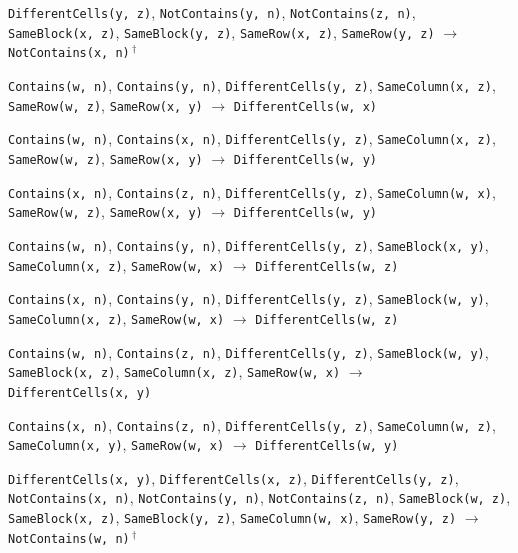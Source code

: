 \documentclass[11pt,a4paper]{article}
\theoremstyle{definition}
\theoremstyle{remark}
\begin{document}
{\begin{enumerate}[label={[\arabic*]},leftmargin=2.6em,itemsep=1pt]
  \item \texttt{DifferentCells(y,~z)}, \allowbreak \texttt{NotContains(y,~n)}, \allowbreak \texttt{NotContains(z,~n)}, \allowbreak \texttt{SameBlock(x,~z)}, \allowbreak \texttt{SameBlock(y,~z)}, \allowbreak \texttt{SameRow(x,~z)}, \allowbreak \texttt{SameRow(y,~z)} \;$\to$\; \texttt{NotContains(x,~n)}\,$^{\dagger}$
  \item \texttt{Contains(w,~n)}, \allowbreak \texttt{Contains(y,~n)}, \allowbreak \texttt{DifferentCells(y,~z)}, \allowbreak \texttt{SameColumn(x,~z)}, \allowbreak \texttt{SameRow(w,~z)}, \allowbreak \texttt{SameRow(x,~y)} \;$\to$\; \texttt{DifferentCells(w,~x)}
  \item \texttt{Contains(w,~n)}, \allowbreak \texttt{Contains(x,~n)}, \allowbreak \texttt{DifferentCells(y,~z)}, \allowbreak \texttt{SameColumn(x,~z)}, \allowbreak \texttt{SameRow(w,~z)}, \allowbreak \texttt{SameRow(x,~y)} \;$\to$\; \texttt{DifferentCells(w,~y)}
  \item \texttt{Contains(x,~n)}, \allowbreak \texttt{Contains(z,~n)}, \allowbreak \texttt{DifferentCells(y,~z)}, \allowbreak \texttt{SameColumn(w,~x)}, \allowbreak \texttt{SameRow(w,~z)}, \allowbreak \texttt{SameRow(x,~y)} \;$\to$\; \texttt{DifferentCells(w,~y)}
  \item \texttt{Contains(w,~n)}, \allowbreak \texttt{Contains(y,~n)}, \allowbreak \texttt{DifferentCells(y,~z)}, \allowbreak \texttt{SameBlock(x,~y)}, \allowbreak \texttt{SameColumn(x,~z)}, \allowbreak \texttt{SameRow(w,~x)} \;$\to$\; \texttt{DifferentCells(w,~z)}
  \item \texttt{Contains(x,~n)}, \allowbreak \texttt{Contains(y,~n)}, \allowbreak \texttt{DifferentCells(y,~z)}, \allowbreak \texttt{SameBlock(w,~y)}, \allowbreak \texttt{SameColumn(x,~z)}, \allowbreak \texttt{SameRow(w,~x)} \;$\to$\; \texttt{DifferentCells(w,~z)}
  \item \texttt{Contains(w,~n)}, \allowbreak \texttt{Contains(z,~n)}, \allowbreak \texttt{DifferentCells(y,~z)}, \allowbreak \texttt{SameBlock(w,~y)}, \allowbreak \texttt{SameBlock(x,~z)}, \allowbreak \texttt{SameColumn(x,~z)}, \allowbreak \texttt{SameRow(w,~x)} \;$\to$\; \texttt{DifferentCells(x,~y)}
  \item \texttt{Contains(x,~n)}, \allowbreak \texttt{Contains(z,~n)}, \allowbreak \texttt{DifferentCells(y,~z)}, \allowbreak \texttt{SameColumn(w,~z)}, \allowbreak \texttt{SameColumn(x,~y)}, \allowbreak \texttt{SameRow(w,~x)} \;$\to$\; \texttt{DifferentCells(w,~y)}
  \item \texttt{DifferentCells(x,~y)}, \allowbreak \texttt{DifferentCells(x,~z)}, \allowbreak \texttt{DifferentCells(y,~z)}, \allowbreak \texttt{NotContains(x,~n)}, \allowbreak \texttt{NotContains(y,~n)}, \allowbreak \texttt{NotContains(z,~n)}, \allowbreak \texttt{SameBlock(w,~z)}, \allowbreak \texttt{SameBlock(x,~z)}, \allowbreak \texttt{SameBlock(y,~z)}, \allowbreak \texttt{SameColumn(w,~x)}, \allowbreak \texttt{SameRow(y,~z)} \;$\to$\; \texttt{NotContains(w,~n)}\,$^{\dagger}$

\end{enumerate}}
\end{document}
